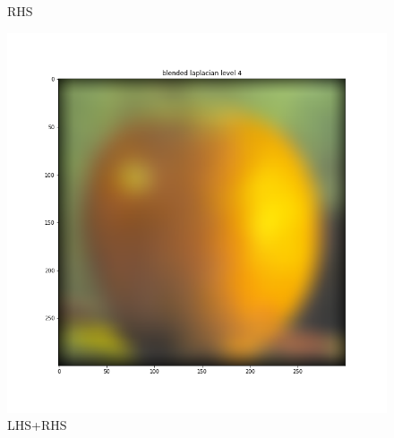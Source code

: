 \documentclass{article}
\begin{document}
\begin{figure}[!htb]
    \caption{RHS}
\endminipage
{}
    \includegraphics[width=\linewidth]{blended laplacian level 4.png}
    \caption{LHS+RHS}
\endminipage
\end{figure}
\end{document}
